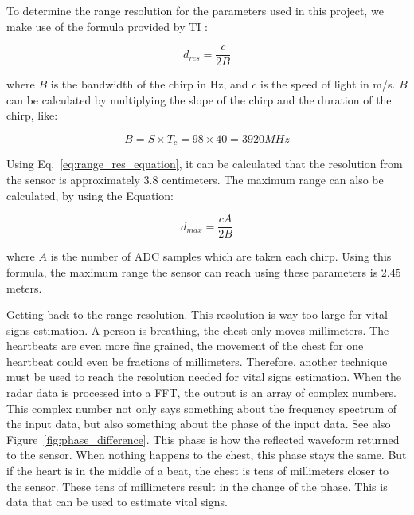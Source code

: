 To determine the range resolution for the parameters used in this project, we make use of the formula provided by TI \cite{range_est_training_website}:

\begin{equation}
d_{res} = \frac{c}{2 B}
\label{eq:range_res_equation}
\end{equation}

where $B$ is the bandwidth of the chirp in Hz, and $c$ is the speed of light in m/s. $B$ can be calculated by multiplying the slope of the chirp and the duration of the chirp, like:

\begin{equation}
B = S \times T_c = 98 \times 40 = 3920 MHz
\label{eq:b_calc}
\end{equation}

Using Eq.~\ref{eq:range_res_equation}, it can be calculated that the resolution from the sensor is approximately 3.8 centimeters. The maximum range can also be calculated, by using the Equation:

\begin{equation}
d_{max} = \frac{c A}{2 B}
\label{eq:range_max_equation}
\end{equation}

where $A$ is the number of ADC samples which are taken each chirp. Using this formula, the maximum range the sensor can reach using these parameters is 2.45 meters. 

Getting back to the range resolution. This resolution is way too large for vital signs estimation. A person is breathing, the chest only moves millimeters. The heartbeats are even more fine grained, the movement of the chest for one heartbeat could even be fractions of millimeters. Therefore, another technique must be used to reach the resolution needed for vital signs estimation. When the radar data is processed into a FFT, the output is an array of complex numbers. This complex number not only says something about the frequency spectrum of the input data, but also something about the phase of the input data. See also Figure~\ref{fig:phase_difference}. This phase is how the reflected waveform returned to the sensor. When nothing happens to the chest, this phase stays the same. But if the heart is in the middle of a beat, the chest is tens of millimeters closer to the sensor. These tens of millimeters result in the change of the phase. This is data that can be used to estimate vital signs. 

